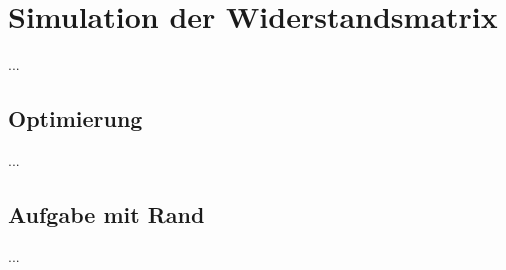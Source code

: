 	\section{Simulation der Widerstandsmatrix}
	...
		\subsection{Optimierung}
		...
		\subsection{Aufgabe mit Rand}
		...